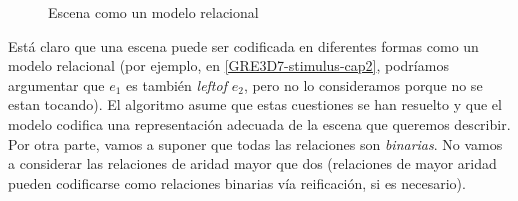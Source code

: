 \begin{figure}[ht]
\begin{minipage}[b]{0.6\linewidth}
\caption{Escena como un modelo relacional}
\label{GRE3D7-stimulus-graph}
\end{minipage}
\end{figure}

Est\'a claro que una escena puede ser codificada en diferentes formas como un
modelo relacional (por ejemplo, en \ref{GRE3D7-stimulus-cap2}, podr\'{i}amos argumentar que
$e_1$ es tambi\'en \emph{leftof} $e_2$, pero no lo consideramos porque no se estan 
tocando). El algoritmo asume que estas cuestiones se han resuelto y que el modelo codifica una representaci\'on adecuada de la escena que
queremos describir. Por otra parte, vamos a suponer que todas las relaciones son
\emph{binarias}. No vamos a considerar las relaciones de aridad mayor que
dos (relaciones de mayor aridad pueden codificarse como relaciones binarias v\'{i}a
reificaci\'on, si es necesario).\\

